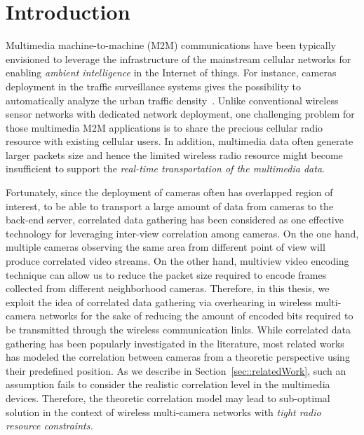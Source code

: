 \chapter{Introduction}
\label{sec::introduction}
Multimedia machine-to-machine (M2M) communications have been typically envisioned to leverage the infrastructure of the mainstream cellular networks for enabling {\em ambient intelligence} in the Internet of things.
For instance, cameras deployment in the traffic surveillance systems gives the possibility to automatically analyze the urban traffic density~\cite{Kapsch,Traficon,Citilog}.
%
Unlike conventional wireless sensor networks with dedicated network deployment, one challenging problem for those multimedia M2M applications is to share the precious cellular radio resource with existing cellular users.
%
In addition, multimedia data often generate larger packets size and hence the limited wireless radio resource might become insufficient to support the {\em real-time transportation of the multimedia data}.

Fortunately, since the deployment of cameras often has overlapped region of interest, to be able to transport a large amount of data from cameras to the back-end server, correlated data gathering has been considered as one effective technology for leveraging inter-view correlation among cameras.
On the one hand, multiple cameras observing the same area from different point of view will produce correlated video streams. 
On the other hand, multiview video encoding technique can allow us to reduce the packet size required to encode frames collected from different neighborhood cameras.
Therefore, in this thesis, we exploit the idea of correlated data gathering via overhearing in wireless multi-camera networks for the sake of reducing the amount of encoded bits required to be transmitted through the wireless communication links.
%
While correlated data gathering has been popularly investigated in the literature, most related works has modeled the correlation between cameras from a theoretic perspective using their predefined position.
As we describe in Section~\ref{sec::relatedWork}, such an assumption fails to consider the realistic correlation level in the multimedia devices.
Therefore, the theoretic correlation model may lead to sub-optimal solution in the context of wireless multi-camera networks with {\em tight radio resource constraints.}

